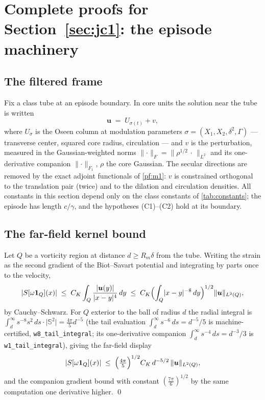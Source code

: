 \documentclass[11pt,letterpaper]{amsart}
\theoremstyle{definition}
\theoremstyle{remark}
\newcommand{\om}{\omega}
\newcommand{\uu}{\boldsymbol{u}}
\newcommand{\norm}[1]{\lVert #1 \rVert}
\newcommand{\abs}[1]{\lvert #1 \rvert}
\begin{document}
\section{Complete proofs for Section~\ref{sec:jc1}: the episode machinery}\label{pfsec:jc1}

\subsection{The filtered frame}\label{pf:frame}
Fix a class tube at an episode boundary. In core units the solution near the tube is
written
\[
\uu \;=\; U_{\sigma(t)} + v,
\]
where $U_\sigma$ is the Oseen column at modulation parameters
$\sigma=(X_1,X_2,\delta^2,\Gamma)$ --- transverse center, squared core radius,
circulation --- and $v$ is the perturbation, measured in the Gaussian-weighted norms
$\norm{\cdot}_F=\norm{\rho^{1/2}\,\cdot\,}_{L^2}$ and its one-derivative companion
$\norm{\cdot}_{F_1}$, $\rho$ the core Gaussian. The secular directions are removed by
the exact adjoint functionals of \cref{pf:m1}: $v$ is constrained orthogonal to the
translation pair (twice) and to the dilation and circulation densities. All constants
in this section depend only on the class constants of \cref{tab:constants}; the
episode has length $c/\gamma$, and the hypotheses (C1)--(C2) hold at its boundary.

\subsection{The far-field kernel bound}\label{pf:w1}
Let $Q$ be a vorticity region at distance $d\ge R_m\delta$ from the tube. Writing the
strain as the second gradient of the Biot--Savart potential and integrating by parts
once to the velocity,
\[
\abs{S[\om\mathbf{1}_Q](x)}\;\le\;C_{K}\int_Q\frac{\abs{\uu(y)}}{\abs{x-y}^{4}}\,dy
\;\le\;C_K\Bigl(\int_Q\abs{x-y}^{-8}\,dy\Bigr)^{1/2}\norm{\uu}_{L^2(Q)},
\]
by Cauchy--Schwarz. For $Q$ exterior to the ball of radius $d$ the radial integral is
$\int_d^\infty s^{-8}s^2\,ds\cdot\abs{\mathbb{S}^2}=\tfrac{4\pi}{5}d^{-5}$
(the tail evaluation $\int_d^\infty s^{-6}\,ds=d^{-5}/5$ is machine-certified,
\texttt{w8\_tail\_integral}; its one-derivative companion
$\int_d^\infty s^{-4}\,ds=d^{-3}/3$ is \texttt{w1\_tail\_integral}), giving the
far-field display
\[
\abs{S[\om\mathbf{1}_Q](x)}\;\le\;\Bigl(\tfrac{4\pi}{5}\Bigr)^{1/2} C_K\,
d^{-5/2}\,\norm{\uu}_{L^2(Q)} ,
\]
and the companion gradient bound with constant $(\tfrac{7\pi}{6})^{1/2}$ by the same
computation one derivative higher. \qed
\end{document}
